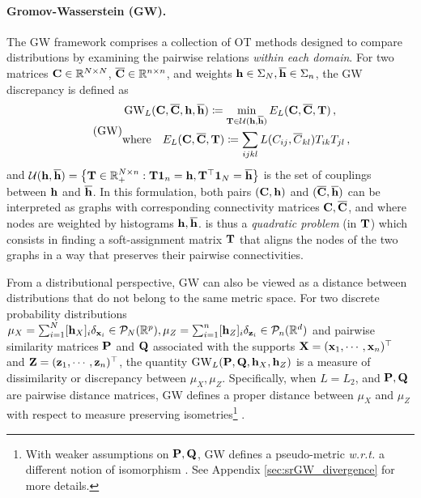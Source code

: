 \paragraph{Gromov-Wasserstein (GW).} The GW framework \citep{memoli2011gromov,sturm2012space} comprises a collection of OT methods designed to compare distributions by examining the pairwise relations \emph{within each domain}. For two matrices ${\mathbf{C}} \in \mathbb{R}^{N \times N}$, $\overline{{\mathbf{C}}} \in \mathbb{R}^{n \times n}$, and weights ${\mathbf{h}} \in \Sigma_N, \overline{{\mathbf{h}}} \in \Sigma_n$, the GW discrepancy is defined as
\begin{equation}
\label{eq:gw_pb} 
\tag{GW}
\begin{split}
	&\operatorname{GW}_L ({\mathbf{C}}, \overline{{\mathbf{C}}}, {\mathbf{h}}, \overline{{\mathbf{h}}}) \coloneqq \min_{{\mathbf{T}} \in {\mathcal{U}}({\mathbf{h}}, \overline{{\mathbf{h}}})} E_L({\mathbf{C}}, \overline{{\mathbf{C}}}, {\mathbf{T}})\,, \\
	&\text{where} \quad E_L({\mathbf{C}}, \overline{{\mathbf{C}}}, {\mathbf{T}}) \coloneqq \sum_{ijkl}  L(C_{ij}, \overline{C}_{kl}) T_{ik} T_{jl}\,,
\end{split}
\end{equation}
and ${\mathcal{U}}({\mathbf{h}}, \overline{{\mathbf{h}}}) = \left\{ {\mathbf{T}} \in \mathbb{R}_+^{N \times n} : {\mathbf{T}} \bm{1}_n = {\mathbf{h}}, {\mathbf{T}}^\top \bm{1}_N = \overline{{\mathbf{h}}} \right\}$ is the set of couplings between ${\mathbf{h}}$ and $\overline{{\mathbf{h}}}$.
In this formulation, both pairs $({\mathbf{C}}, {\mathbf{h}})$ and $(\overline{{\mathbf{C}}}, \overline{{\mathbf{h}}})$ can be interpreted as graphs with corresponding connectivity matrices ${\mathbf{C}}, \overline {{\mathbf{C}}}$, and where nodes are weighted by histograms ${\mathbf{h}}, \overline {{\mathbf{h}}}$.  is thus a \emph{quadratic problem} (in ${\mathbf{T}}$) which consists in finding a soft-assignment matrix ${\mathbf{T}}$ that aligns the nodes of the two graphs in a way that preserves their pairwise connectivities. 

From a distributional perspective, GW can also be viewed as a distance between distributions that do not belong to the same metric space. For two discrete probability distributions $\mu_X = \sum_{i=1}^N [{\mathbf{h}}_X]_i \delta_{{\mathbf{x}}_i} \in {\mathcal{P}}_N(\mathbb{R}^{p}), \mu_Z =\sum_{i=1}^n [{\mathbf{h}}_Z]_i \delta_{{\mathbf{z}}_i} \in {\mathcal{P}}_n(\mathbb{R}^d)$ and pairwise similarity matrices ${\mathbf{P}}$ and ${\mathbf{Q}}$ associated with the supports ${\mathbf{X}} = ({\mathbf{x}}_1, \cdots, {\mathbf{x}}_n)^\top$ and ${\mathbf{Z}} = ({\mathbf{z}}_1, \cdots, {\mathbf{z}}_n)^\top$, the quantity $\operatorname{GW}_L ({\mathbf{P}}, {\mathbf{Q}}, {\mathbf{h}}_X, {\mathbf{h}}_Z)$ is a measure of dissimilarity or discrepancy between $\mu_X, \mu_Z$. Specifically, when $L=L_2$, and ${\mathbf{P}}, {\mathbf{Q}}$ are pairwise distance matrices, GW defines a proper distance between $\mu_X$ and $\mu_Z$ with respect to measure preserving isometries\footnote{With weaker assumptions on ${\mathbf{P}}, {\mathbf{Q}}$, GW defines a pseudo-metric \textit{w.r.t.} a different notion of isomorphism \citep{chowdhury2019gromov}. See Appendix \ref{sec:srGW_divergence} for more details.} \citep{memoli2011gromov}. 

